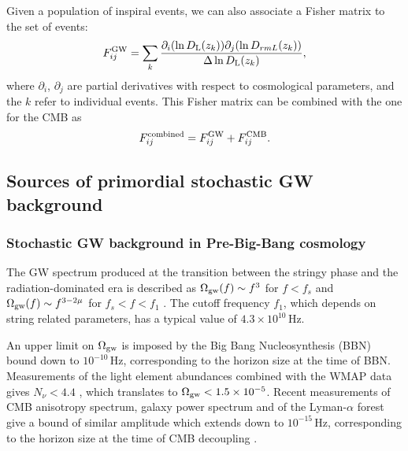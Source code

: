 Given a population of inspiral events, we can also associate a 
Fisher matrix to the set of events:
\begin{equation}
F_{ij}^{\rm GW} = \sum_k \frac{\partial_i(\ln D_{\rm L}(z_k)) 
\partial_j(\ln D_{rm L}(z_k))}{\Delta \ln D_{\rm L}(z_k)},
\end{equation}
where $\partial_i$, $\partial_j$ are partial derivatives with 
respect to cosmological parameters, and the $k$ refer to 
individual events. This Fisher matrix can be combined with the 
one for the CMB as
\begin{equation}
F_{ij}^{\rm combined} = F_{ij}^{\rm GW} + F_{ij}^{\rm CMB}.
\end{equation}

\subsection{Sources of primordial stochastic GW background}

\subsubsection{Stochastic GW background in Pre-Big-Bang cosmology}

\label{box:prebigbang}
The GW spectrum
produced at the transition between the stringy phase and the radiation-dominated era is
described as $\Omega_{\rm gw}(f)\sim f^3$ for $f<f_s$ and
$\Omega_{\rm gw}(f) \sim f^{3-2\mu}$ for $f_s<f<f_1$ \cite{Buonanno1997,mand06}.
%
The cutoff frequency $f_1$, which depends on string related
parameters, has a typical value of $4.3 \times 10^{10}$\,Hz. 

An upper
limit on $\Omega_{\rm gw}$ is imposed by the Big Bang
Nucleosynthesis (BBN) bound down to $10^{-10}$\,Hz, corresponding to the
horizon size at the time of BBN.
Measurements of the light element abundances combined with the WMAP
data gives $N_{\nu}<4.4$ \cite{cyb05}, which translates to $\Omega_{\rm gw} < 1.5
\times 10^{-5}$. 
%
Recent measurements of CMB anisotropy spectrum, galaxy power
spectrum and of the Lyman-$\alpha$ forest give a bound of similar amplitude
which extends down to $10^{-15}$\,Hz, corresponding to the horizon size
at the time of CMB decoupling \cite{smi06}.

